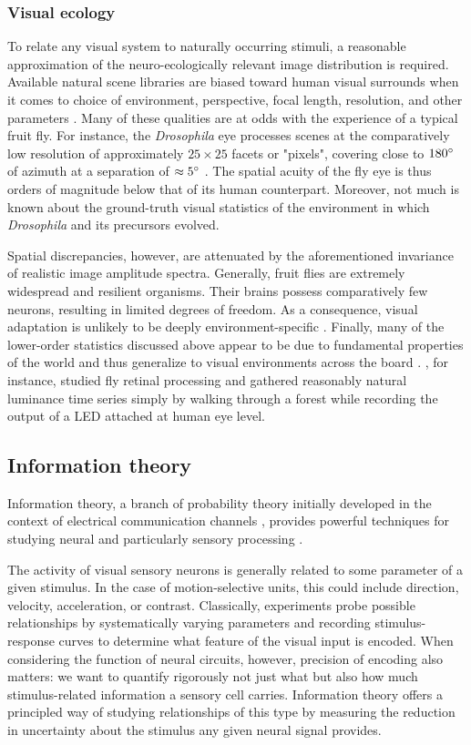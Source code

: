 \subsubsection{Visual ecology}
To relate any visual system to naturally occurring stimuli, a reasonable approximation of the neuro-ecologically relevant image distribution is required. Available natural scene libraries are biased toward human visual surrounds when it comes to choice of environment, perspective, focal length, resolution, and other parameters \citep{Tkacik:2011aa}. Many of these qualities are at odds with the experience of a typical fruit fly. For instance, the \textit{Drosophila} eye processes scenes at the comparatively low resolution of approximately $25 \times 25$ facets or "pixels", covering close to $180\degree$ of azimuth at a separation of $\approx5\degree$ \citep{Borst:2009gv}. The spatial acuity of the fly eye is thus orders of magnitude below that of its human counterpart. Moreover, not much is known about the ground-truth visual statistics of the environment in which \textit{Drosophila} and its precursors evolved.

Spatial discrepancies, however, are attenuated by the aforementioned invariance of realistic image amplitude spectra. Generally, fruit flies are extremely widespread and resilient organisms. Their brains possess comparatively few neurons, resulting in limited degrees of freedom. As a consequence, visual adaptation is unlikely to be deeply environment-specific \citep{Dickinson:2014aa}. Finally, many of the lower-order statistics discussed above appear to be due to fundamental properties of the world and thus generalize to visual environments across the board \citep{Geisler:2008gu,Simoncelli:2001dn}. \citet{vanHateren:1997vg}, for instance, studied fly retinal processing and gathered reasonably natural luminance time series simply by walking through a forest while recording the output of a LED attached at human eye level.

\subsection{Information theory}

Information theory, a branch of probability theory initially developed in the context of electrical communication channels \citep{Shannon:1948aa}, provides powerful techniques for studying neural and particularly sensory processing \citep{Borst:1999hw}.

The activity of visual sensory neurons is generally related to some parameter of a given stimulus. In the case of motion-selective units, this could include direction, velocity, acceleration, or contrast. Classically, experiments probe possible relationships by systematically varying parameters and recording stimulus-response curves to determine what feature of the visual input is encoded. When considering the function of neural circuits, however, precision of encoding also matters: we want to quantify rigorously not just what but also how much stimulus-related information a sensory cell carries. Information theory offers a principled way of studying relationships of this type by measuring the reduction in uncertainty about the stimulus any given neural signal provides.


